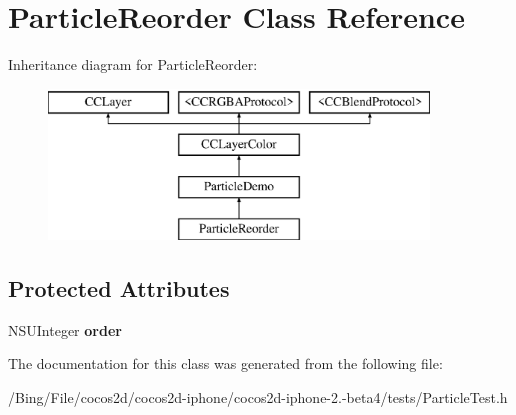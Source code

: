 \hypertarget{interface_particle_reorder}{\section{Particle\-Reorder Class Reference}
\label{interface_particle_reorder}
}
Inheritance diagram for Particle\-Reorder\-:\begin{figure}[H]
\begin{center}
\leavevmode
\includegraphics[height=4.000000cm]{interface_particle_reorder}
\end{center}
\end{figure}
\subsection*{Protected Attributes}
\begin{DoxyCompactItemize}
\item 
\hypertarget{interface_particle_reorder_a0e9c9f1ff6895c9a395f388843372852}{N\-S\-U\-Integer {\bfseries order}}\label{interface_particle_reorder_a0e9c9f1ff6895c9a395f388843372852}

\end{DoxyCompactItemize}


The documentation for this class was generated from the following file\-:\begin{DoxyCompactItemize}
\item 
/\-Bing/\-File/cocos2d/cocos2d-\/iphone/cocos2d-\/iphone-\/2.-\/beta4/tests/Particle\-Test.\-h\end{DoxyCompactItemize}
